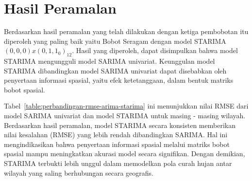 \section{Hasil Peramalan}
Berdasarkan hasil peramalan yang telah dilakukan dengan ketiga pembobotan itu diperoleh yang paling baik yaitu Bobot Seragam dengan model STARIMA $(0,0,0) x (0,1,1_{0})_{12}$.
Hasil yang diperoleh, dapat disimpulkan bahwa model STARIMA mengungguli model SARIMA univariat. Keunggulan model STARIMA dibandingkan model SARIMA univariat dapat disebabkan oleh penyertaan informasi    spasial, yaitu efek ketetanggaan, dalam bentuk matriks bobot spasial.

Tabel~\ref{table:perbandingan-rmse-arima-starima} ini menunjukkan nilai RMSE dari model SARIMA univariat dan model STARIMA untuk masing - masing wilayah.
Berdasarkan hasil peramalan, model STARIMA secara konsisten memberikan nilai kesalahan (RMSE) yang lebih rendah dibandingkan SARIMA.
Hal ini mengindikasikan bahwa penyertaan informasi spasial melalui matriks bobot spasial mampu meningkatkan akurasi model secara signifikan.
Dengan demikian, STARIMA terbukti lebih unggul dalam memodelkan pola curah hujan antar wilayah yang saling berhubungan secara geografis.